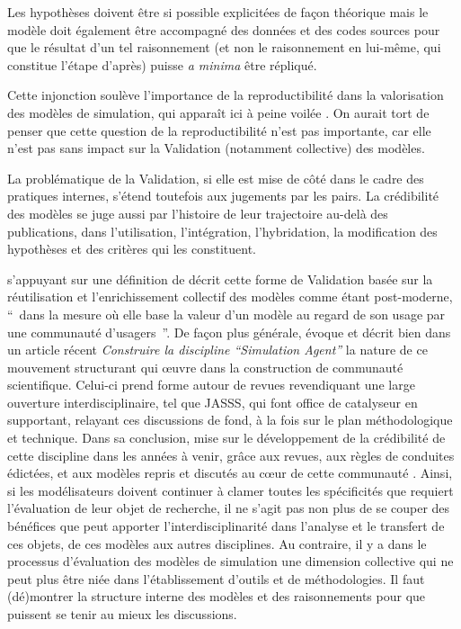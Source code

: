 Les hypothèses doivent être si possible explicitées de façon théorique mais le modèle doit également être accompagné des données et des codes sources pour que le résultat d'un tel raisonnement (et non le raisonnement en lui-même, qui constitue l'étape d'après) puisse \textit{a minima} être répliqué. %

Cette injonction soulève l'importance de la reproductibilité dans la valorisation des modèles de simulation, qui apparaît ici à peine voilée \autocites{Amblard2006, Wilensky2007a, Rouchier2013, Thiele2015}. On aurait tort de penser que cette question de la reproductibilité n'est pas importante, car elle n'est pas sans impact sur la Validation (notamment collective) des modèles.

La problématique de la Validation, si elle est mise de côté dans le cadre des pratiques internes, s'étend toutefois aux jugements par les pairs. La crédibilité des modèles se juge aussi par l'histoire de leur trajectoire au-delà des publications, dans l'utilisation, l'intégration, l'hybridation, la modification des hypothèses et des critères qui les constituent.

\textcites{Rouchier2013} s'appuyant sur une définition de \textcite{Ahrweiler2005} décrit cette forme de Validation basée sur la réutilisation et l'enrichissement collectif des modèles comme étant post-moderne, \enquote{ dans la mesure où elle base la valeur d'un modèle au regard de son usage par une communauté d'usagers }. De façon plus générale, \autocite{Rouchier2013} évoque et décrit bien dans un article récent \textit{Construire la discipline \enquote{Simulation Agent}} la nature de ce mouvement structurant qui œuvre dans la construction de communauté scientifique. Celui-ci prend forme autour de revues revendiquant une large ouverture interdisciplinaire, tel que JASSS, qui font office de catalyseur en supportant, relayant ces discussions de fond, à la fois sur le plan méthodologique et technique. Dans sa conclusion, \autocite{Rouchier2013} mise sur le développement de la crédibilité de cette discipline dans les années à venir, grâce aux revues, aux règles de conduites édictées, et aux modèles repris et discutés au cœur de cette communauté \autocite{Hales2003}. Ainsi, si les modélisateurs doivent continuer à clamer toutes les spécificités que requiert l'évaluation de leur objet de recherche, il ne s'agit pas non plus de se couper des bénéfices que peut apporter l'interdisciplinarité dans l'analyse et le transfert de ces objets, de ces modèles aux autres disciplines. Au contraire, il y a dans le processus d'évaluation des modèles de simulation une dimension collective qui ne peut plus être niée dans l'établissement d'outils et de méthodologies. Il faut (dé)montrer la structure interne des modèles et des raisonnements pour que puissent se tenir au mieux les discussions.

